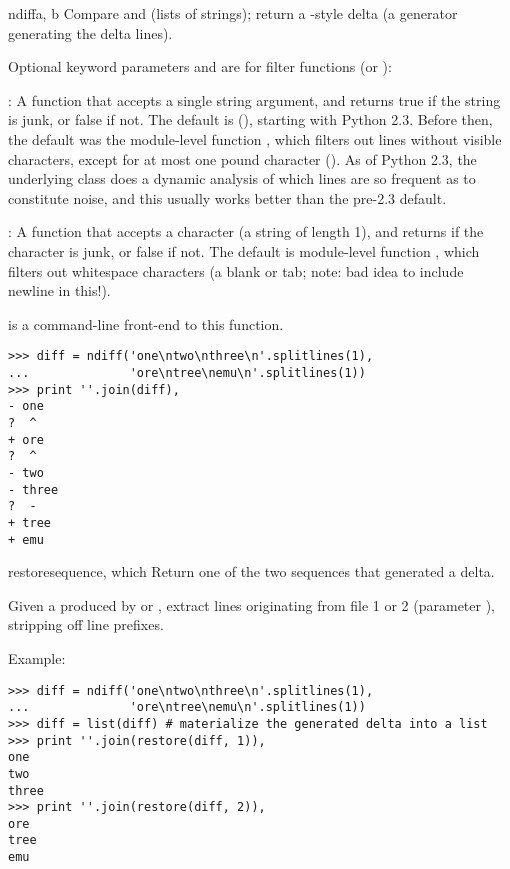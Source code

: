 \begin{funcdesc}{ndiff}{a, b}
  Compare  and  (lists of strings); return a
  -style delta (a generator generating the delta lines).

  Optional keyword parameters  and  are
  for filter functions (or ):

  : A function that accepts a single string
  argument, and returns true if the string is junk, or false if not.
  The default is (), starting with Python 2.3.  Before then,
  the default was the module-level function
  , which filters out lines without visible
  characters, except for at most one pound character (\character{\#}).
  As of Python 2.3, the underlying  class
  does a dynamic analysis of which lines are so frequent as to
  constitute noise, and this usually works better than the pre-2.3
  default.

  : A function that accepts a character (a string of
  length 1), and returns if the character is junk, or false if not.
  The default is module-level function ,
  which filters out whitespace characters (a blank or tab; note: bad
  idea to include newline in this!).

   is a command-line front-end to this
  function.

\begin{verbatim}
>>> diff = ndiff('one\ntwo\nthree\n'.splitlines(1),
...              'ore\ntree\nemu\n'.splitlines(1))
>>> print ''.join(diff),
- one
?  ^
+ ore
?  ^
- two
- three
?  -
+ tree
+ emu
\end{verbatim}
\end{funcdesc}

\begin{funcdesc}{restore}{sequence, which}
  Return one of the two sequences that generated a delta.

  Given a  produced by  or
  , extract lines originating from file 1 or 2
  (parameter ), stripping off line prefixes.

  Example:

\begin{verbatim}
>>> diff = ndiff('one\ntwo\nthree\n'.splitlines(1),
...              'ore\ntree\nemu\n'.splitlines(1))
>>> diff = list(diff) # materialize the generated delta into a list
>>> print ''.join(restore(diff, 1)),
one
two
three
>>> print ''.join(restore(diff, 2)),
ore
tree
emu
\end{verbatim}

\end{funcdesc}

